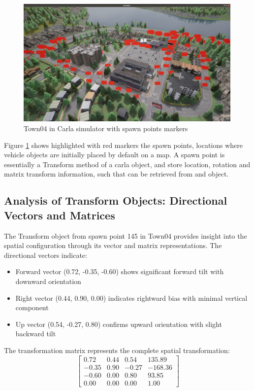 \begin{figure}[h]
    \centering
    \includegraphics[width=0.99\textwidth]{Figures/Methods/CarlaSpawnPointsTown04_40pc.png}
    \caption{Town04 in Carla simulator with spawn points markers}
    \label{fig:CarlaSpawnPointsTown04_40pc}
\end{figure}

Figure \ref{fig:CarlaSpawnPointsTown04_40pc} shows highlighted with red markers the spawn points, locations where vehicle objects are initially placed by default on a map. A spawn point is essentially a Transform method of a carla object, and store location, rotation and matrix transform information, such that can be retrieved from and object.

\subsection{Analysis of Transform Objects: Directional Vectors and Matrices}

The Transform object from spawn point 145 in Town04 provides insight into the spatial configuration through its vector and matrix representations. The directional vectors indicate:

\begin{itemize}
    \item Forward vector (0.72, -0.35, -0.60) shows significant forward tilt with downward orientation
    \item Right vector (0.44, 0.90, 0.00) indicates rightward bias with minimal vertical component
    \item Up vector (0.54, -0.27, 0.80) confirms upward orientation with slight backward tilt
\end{itemize}

The transformation matrix represents the complete spatial transformation:
\begin{equation*}
\begin{bmatrix}
0.72 & 0.44 & 0.54 & 135.89 \\
-0.35 & 0.90 & -0.27 & -168.36 \\
-0.60 & 0.00 & 0.80 & 93.85 \\
0.00 & 0.00 & 0.00 & 1.00
\end{bmatrix}
\end{equation*}

